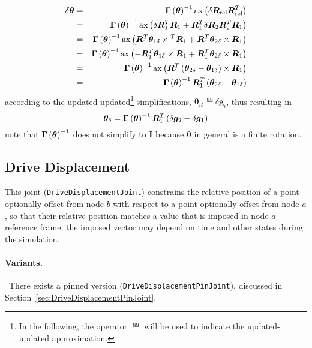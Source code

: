 \documentclass[10pt,fleqn,subeqn]{report}
\newcommand{\T}[1]{\bm{#1}}
\newcommand{\equu}{\overset{\text{uu}}{=}}
\begin{document}
\begin{eqnarray*}
	\delta\T{\theta}
		& = & \T{\Gamma}\plbr{\T{\theta}}^{-1} 
			\llk{ax}\plbr{\delta\T{R}_{\text{rel}} \T{R}_{\text{rel}}^T} \\
		& = & \T{\Gamma}\plbr{\T{\theta}}^{-1} \llk{ax}\plbr{
			\delta\T{R}_1^T \T{R}_1
			+ \T{R}_1^T \delta\T{R}_2 \T{R}_2^T \T{R}_1
		} \\
		& = & \T{\Gamma}\plbr{\T{\theta}}^{-1} \llk{ax}\plbr{
			\T{R}_1^T \T{\theta}_{1\delta}\times{}^T \T{R}_1
			+ \T{R}_1^T \T{\theta}_{2\delta}\times{} \T{R}_1
		} \\
		& = & \T{\Gamma}\plbr{\T{\theta}}^{-1} \llk{ax}\plbr{
			- \T{R}_1^T \T{\theta}_{1\delta}\times{} \T{R}_1
			+ \T{R}_1^T \T{\theta}_{2\delta}\times{} \T{R}_1
		} \\
		& = & \T{\Gamma}\plbr{\T{\theta}}^{-1}
			\llk{ax} \plbr{
				\T{R}_1^T \plbr{
					\T{\theta}_{2\delta}
					- \T{\theta}_{1\delta}
				}\times \T{R}_1
			} \\
		& = & \T{\Gamma}\plbr{\T{\theta}}^{-1} \T{R}_1^T \plbr{
			\T{\theta}_{2\delta} - \T{\theta}_{1\delta}
		}
\end{eqnarray*}
according to the updated-updated\footnote{In the following, 
the operator $\equu$ will be used to indicate the updated-updated
approximation.} simplifications,
$\T{\theta}_{i\delta}\equu\delta\T{g}_i$, thus resulting in
\begin{equation}
	\T{\theta}_{\delta} = \T{\Gamma}\plbr{\T{\theta}}^{-1} \T{R}_1^T \plbr{
		\delta\T{g}_2 - \delta\T{g}_1
	}
	\label{eq:DRIVE-HINGE-theta-delta}
\end{equation}
note that $\T{\Gamma}\plbr{\T{\theta}}^{-1}$ does not simplify to $\T{I}$
because $\T{\theta}$ in general is a finite rotation.



\subsection{Drive Displacement}
\label{sec:DriveDisplacementJoint}
This joint (\texttt{DriveDisplacementJoint}) constrains the relative position
of a point optionally offset from node $b$ with respect to a point
optionally offset from node $a$, so that their relative position matches
a value that is imposed in node $a$ reference frame; the imposed vector
may depend on time and other states during the simulation.

\paragraph{Variants.} \
There exists a pinned version (\texttt{DriveDisplacementPinJoint}),
discussed in Section~\ref{sec:DriveDisplacementPinJoint}.
\end{document}
